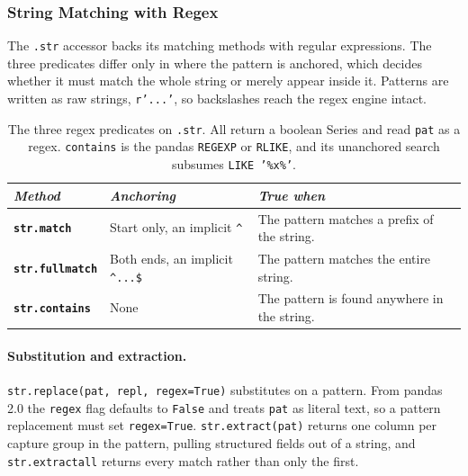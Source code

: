 \subsubsection{String Matching with Regex}

The \texttt{.str} accessor backs its matching methods with regular expressions. The three predicates differ only in where the pattern is anchored, which decides whether it must match the whole string or merely appear inside it. Patterns are written as raw strings, \texttt{r'...'}, so backslashes reach the regex engine intact.

\vspace{1ex}

\begin{table}[H]
\centering
\footnotesize
\renewcommand{\arraystretch}{1.4}
\begin{tabularx}{\textwidth}{>{\raggedright\arraybackslash}p{} >{\raggedright\arraybackslash}p{} >{\raggedright\arraybackslash}X}
\toprule
\textit{Method} & \textit{Anchoring} & \textit{True when} \\
\midrule
\textbf{\texttt{str.match}} & Start only, an implicit \texttt{\textasciicircum} & The pattern matches a prefix of the string. \\
\textbf{\texttt{str.fullmatch}} & Both ends, an implicit \texttt{\textasciicircum...\$} & The pattern matches the entire string. \\
\textbf{\texttt{str.contains}} & None & The pattern is found anywhere in the string. \\
\bottomrule
\end{tabularx}
\caption*{The three regex predicates on \texttt{.str}. All return a boolean Series and read \texttt{pat} as a regex. \texttt{contains} is the pandas \texttt{REGEXP} or \texttt{RLIKE}, and its unanchored search subsumes \texttt{LIKE '\%x\%'}.}
\end{table}

\vspace{-2ex}

\paragraph{Substitution and extraction.} \texttt{str.replace(pat, repl, regex=True)} substitutes on a pattern. From pandas 2.0 the \texttt{regex} flag defaults to \texttt{False} and treats \texttt{pat} as literal text, so a pattern replacement must set \texttt{regex=True}. \texttt{str.extract(pat)} returns one column per capture group in the pattern, pulling structured fields out of a string, and \texttt{str.extractall} returns every match rather than only the first.

